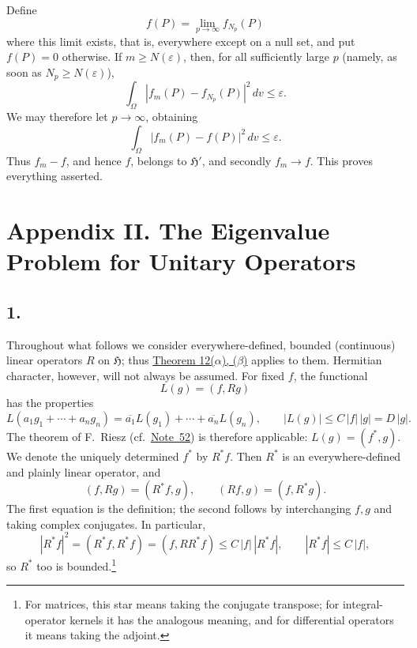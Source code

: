 ﻿\documentclass[paper=b5,fontsize=13pt,bookmarkpackage=false,twoside]{scrartcl}
\begin{document}
Define
\[
  f(P)=\lim_{p\to\infty}f_{N_p}(P)
\]
where this limit exists, that is, everywhere except on a null set, and
put \(f(P)=0\) otherwise.  If \(m\geq N(\varepsilon)\), then, for all
sufficiently large \(p\) (namely, as soon as
\(N_p\geq N(\varepsilon)\)),
\[
  \int_\Omega |f_m(P)-f_{N_p}(P)|^2\,dv\leq\varepsilon .
\]
We may therefore let \(p\to\infty\), obtaining
\[
  \int_\Omega |f_m(P)-f(P)|^2\,dv\leq\varepsilon .
\]
Thus \(f_m-f\), and hence \(f\), belongs to \(\mathfrak H'\), and
secondly \(f_m\to f\).  This proves everything asserted.

\section*{Appendix II. The Eigenvalue Problem for Unitary Operators}
\label{app:II}

\subsection*{1.}
\label{appII:1}

Throughout what follows we consider everywhere-defined, bounded
(continuous) linear operators \(R\) on \(\mathfrak H\); thus
\hyperref[thm:12]{Theorem 12(\(\alpha\)), (\(\beta\))} applies to them.  Hermitian
character, however, will not always be assumed.  For fixed \(f\), the
functional
\[
  L(g)=(f,Rg)
\]
has the properties
\[
  L(a_1g_1+\cdots+a_ng_n)
  =\overline{a_1}L(g_1)+\cdots+\overline{a_n}L(g_n),
  \qquad
  |L(g)|\leq C\,|f|\,|g|=D\,|g|.
\]
The theorem of F.~Riesz (cf.\ \hyperref[fn:52]{Note~52}) is therefore applicable:
\(L(g)=(f^*,g)\).  We denote the uniquely determined \(f^*\) by
\(R^*f\).  Then \(R^*\) is an everywhere-defined and plainly linear
operator, and
\[
  (f,Rg)=(R^*f,g),\qquad (Rf,g)=(f,R^*g).
\]
The first equation is the definition; the second follows by
interchanging \(f,g\) and taking complex conjugates.  In particular,
\[
  |R^*f|^2=(R^*f,R^*f)=(f,RR^*f)
  \leq C\,|f|\,|R^*f|,
  \qquad |R^*f|\leq C\,|f|,
\]
so \(R^*\) too is bounded.\footnote{\label{fn:64}For matrices, this star means taking
the conjugate transpose; for integral-operator kernels it has the
analogous meaning, and for differential operators it means taking the
adjoint.}
\end{document}
